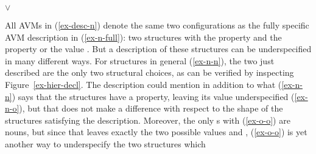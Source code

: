 \documentclass[output=paper
 	        ,biblatex
                ,babelshorthands
                ,newtxmath
                ,draftmode
                ,colorlinks, citecolor=brown
]{langscibook}
\begin{document}
\eal
\label{ex-desc-n}
\ex\label{ex-n-full} 
\ex\label{ex-n-n}
\ex\label{ex-n-o}
\ex\label{ex-o-o} 
\ex\label{ex-n-sfull} 
     $\lor$  
\zl

All AVMs in (\ref{ex-desc-n}) denote the same two configurations as
the fully specific AVM description in (\ref{ex-n-full}): two
 structures with the  property  and
the  property  or the  value
. But a description of these structures can be
underspecified in many different ways. For  structures in
general (\ref{ex-n-n}), the two just described are the only two
structural choices, as can be verified by inspecting
Figure~\ref{ex-hier-decl}. The description could mention in addition
to what (\ref{ex-n-n}) says that
the structures have a  property, leaving its value
underspecified (\ref{ex-n-o}), but that does not make a difference
with respect to the shape of the structures satisfying the
description. Moreover, the only s with 
(\ref{ex-o-o}) are nouns, but since that leaves exactly the two possible
 values  and , (\ref{ex-o-o}) is
yet another way to underspecify the two structures which
\end{document}
